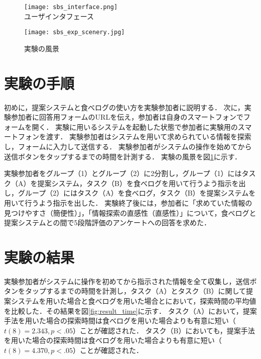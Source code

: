 \begin{figure}[t]
  \begin{minipage}{0.49\hsize}
    \begin{center}
      \texttt{[image: sbs\_interface.png]}\\
      \caption{ユーザインタフェース}
      \label{fig:interface}
    \end{center}
  \end{minipage}
  \begin{minipage}{0.49\hsize}
    \begin{center}
      \texttt{[image: sbs\_exp\_scenery.jpg]}\\
      \caption{実験の風景}
      \label{fig:exp_scenery}
    \end{center}
  \end{minipage}
\end{figure}

\section{実験の手順}
  初めに，提案システムと食べログの使い方を実験参加者に説明する．
  次に，実験参加者に回答用フォームのURLを伝え，参加者は自身のスマートフォンでフォームを開く．
  実験に用いるシステムを起動した状態で参加者に実験用のスマートフォンを渡す．
  実験参加者はシステムを用いて求められている情報を探索し，フォームに入力して送信する．
  実験参加者がシステムの操作を始めてから送信ボタンをタップするまでの時間を計測する．
  実験の風景を図\ref{fig:exp_scenery}に示す．

  実験参加者をグループ（1）とグループ（2）に2分割し，グループ（1）にはタスク（A）を提案システム，タスク（B）を食べログを用いて行うよう指示を出し，グループ（2）にはタスク（A）を食べログ，タスク（B）を提案システムを用いて行うよう指示を出した．
  実験終了後には，参加者に「求めていた情報の見つけやすさ（簡便性）」，「情報探索の直感性（直感性）」について，食べログと提案システムとの間で5段階評価のアンケートへの回答を求めた．

\section{実験の結果}
  実験参加者がシステムに操作を初めてから指示された情報を全て収集し，送信ボタンをタップするまでの時間を計測し，タスク（A）とタスク（B）に関して提案システムを用いた場合と食べログを用いた場合とにおいて，探索時間の平均値を比較した．その結果を図\ref{fig:result_time}に示す．
  タスク（A）において，提案手法を用いた場合の探索時間は食べログを用いた場合よりも有意に短い（$t(8)=2.343, p<.05$）ことが確認された．
  タスク（B）においても，提案手法を用いた場合の探索時間は食べログを用いた場合よりも有意に短い（$t(8)=4.370, p<.05$）ことが確認された．

